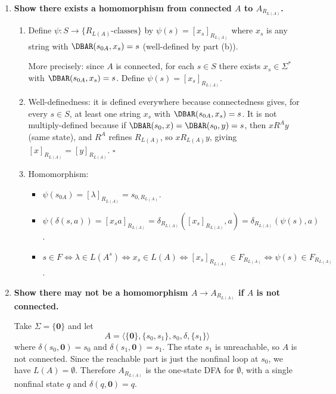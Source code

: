 \begin{enumerate}[{3.}1.]
\item \textbf{Show there exists a homomorphism from connected $A$ to $A_{R_{L(A)}}$.}

\begin{enumerate}
\item Define $\psi: S\to\{R_{L(A)}\text{-classes}\}$ by $\psi(s)=[x_s]_{R_{L(A)}}$ where $x_s$ is any string with $\DBAR(s_{0A},x_s)=s$ (well-defined by part (b)).

More precisely: since $A$ is connected, for each $s\in S$ there exists $x_s\in\Sigma^*$ with $\DBAR(s_{0A},x_s)=s$. Define $\psi(s)=[x_s]_{R_{L(A)}}$.

\item Well-definedness: it is defined everywhere because connectedness gives, for every $s\in S$, at least one string $x_s$ with $\DBAR(s_{0A},x_s)=s$. It is not multiply-defined because if $\DBAR(s_0,x)=\DBAR(s_0,y)=s$, then $x R^A y$ (same state), and $R^A$ refines $R_{L(A)}$, so $x R_{L(A)} y$, giving $[x]_{R_{L(A)}}=[y]_{R_{L(A)}}$. $\square$

\item Homomorphism:
\begin{itemize}
\item $\psi(s_{0A})=[\lambda]_{R_{L(A)}}=s_{0,R_{L(A)}}$. \checkmark
\item $\psi(\delta(s,a))=[x_s a]_{R_{L(A)}}=\delta_{R_{L(A)}}([x_s]_{R_{L(A)}},a)=\delta_{R_{L(A)}}(\psi(s),a)$. \checkmark
\item $s\in F\Leftrightarrow\lambda\in L(A^s)\Leftrightarrow x_s\in L(A)\Leftrightarrow[x_s]_{R_{L(A)}}\in F_{R_{L(A)}}\Leftrightarrow\psi(s)\in F_{R_{L(A)}}$. \checkmark
\end{itemize}
\end{enumerate}

\item \textbf{Show there may not be a homomorphism $A\to A_{R_{L(A)}}$ if $A$ is not connected.}

Take $\Sigma=\{\pmb{0}\}$ and let
\[
A=\langle \{\pmb{0}\},\{s_0,s_1\},s_0,\delta,\{s_1\}\rangle
\]
where $\delta(s_0,\pmb{0})=s_0$ and $\delta(s_1,\pmb{0})=s_1$. The state $s_1$ is
unreachable, so $A$ is not connected. Since the reachable part is just the
nonfinal loop at $s_0$, we have $L(A)=\emptyset$. Therefore $A_{R_{L(A)}}$ is the
one-state DFA for $\emptyset$, with a single nonfinal state $q$ and
$\delta(q,\pmb{0})=q$.


\end{enumerate}
